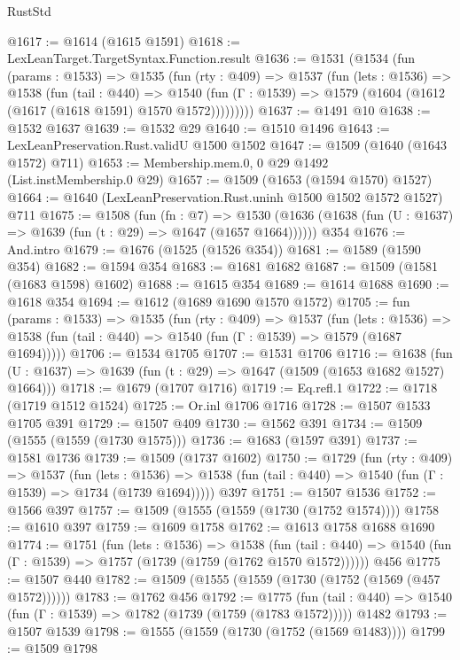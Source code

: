 \begin{lexlean}{RustStd}
\begin{coremodule}
@1617 := @1614 (@1615 @1591)
@1618 := LexLeanTarget.TargetSyntax.Function.result
@1636 := @1531
    (@1534
      (fun (params : @1533) =>
      @1535
        (fun (rty : @409) =>
        @1537
          (fun (lets : @1536) =>
          @1538
            (fun (tail : @440) =>
            @1540 (fun (Γ : @1539) => @1579 (@1604 (@1612 (@1617 (@1618 @1591) @1570 @1572)))))))))
@1637 := @1491 @10
@1638 := @1532 @1637
@1639 := @1532 @29
@1640 := @1510 @1496
@1643 := LexLeanPreservation.Rust.validU @1500 @1502
@1647 := @1509 (@1640 (@1643 @1572) @711)
@1653 := Membership.mem.{0, 0} @29 @1492 (List.instMembership.{0} @29)
@1657 := @1509 (@1653 (@1594 @1570) @1527)
@1664 := @1640 (LexLeanPreservation.Rust.uninh @1500 @1502 @1572 @1527) @711
@1675 := @1508
    (fun (fn : @7) =>
    @1530 (@1636 (@1638 (fun (U : @1637) => @1639 (fun (t : @29) => @1647 (@1657 @1664))))))
    @354
@1676 := And.intro
@1679 := @1676 (@1525 (@1526 @354))
@1681 := @1589 (@1590 @354)
@1682 := @1594 @354
@1683 := @1681 @1682
@1687 := @1509 (@1581 (@1683 @1598) @1602)
@1688 := @1615 @354
@1689 := @1614 @1688
@1690 := @1618 @354
@1694 := @1612 (@1689 @1690 @1570 @1572)
@1705 := fun (params : @1533) =>
  @1535
    (fun (rty : @409) =>
    @1537
      (fun (lets : @1536) =>
      @1538 (fun (tail : @440) => @1540 (fun (Γ : @1539) => @1579 (@1687 @1694)))))
@1706 := @1534 @1705
@1707 := @1531 @1706
@1716 := @1638 (fun (U : @1637) => @1639 (fun (t : @29) => @1647 (@1509 (@1653 @1682 @1527) @1664)))
@1718 := @1679 (@1707 @1716)
@1719 := Eq.refl.{1}
@1722 := @1718 (@1719 @1512 @1524)
@1725 := Or.inl @1706 @1716
@1728 := @1507 @1533 @1705 @391
@1729 := @1507 @409
@1730 := @1562 @391
@1734 := @1509 (@1555 (@1559 (@1730 @1575)))
@1736 := @1683 (@1597 @391)
@1737 := @1581 @1736
@1739 := @1509 (@1737 @1602)
@1750 := @1729
    (fun (rty : @409) =>
    @1537
      (fun (lets : @1536) =>
      @1538 (fun (tail : @440) => @1540 (fun (Γ : @1539) => @1734 (@1739 @1694)))))
    @397
@1751 := @1507 @1536
@1752 := @1566 @397
@1757 := @1509 (@1555 (@1559 (@1730 (@1752 @1574))))
@1758 := @1610 @397
@1759 := @1609 @1758
@1762 := @1613 @1758 @1688 @1690
@1774 := @1751
    (fun (lets : @1536) =>
    @1538
      (fun (tail : @440) => @1540 (fun (Γ : @1539) => @1757 (@1739 (@1759 (@1762 @1570 @1572))))))
    @456
@1775 := @1507 @440
@1782 := @1509 (@1555 (@1559 (@1730 (@1752 (@1569 (@457 @1572))))))
@1783 := @1762 @456
@1792 := @1775
    (fun (tail : @440) => @1540 (fun (Γ : @1539) => @1782 (@1739 (@1759 (@1783 @1572)))))
    @1482
@1793 := @1507 @1539
@1798 := @1555 (@1559 (@1730 (@1752 (@1569 @1483))))
@1799 := @1509 @1798

\end{coremodule}
\end{lexlean}
